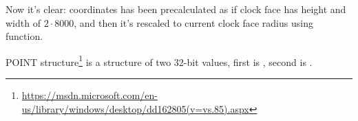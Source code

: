 Now it's clear: coordinates has been precalculated as if clock face has height and width of $2 \cdot 8000$,
and then it's rescaled to current clock face radius using  function.

POINT structure\footnote{\url{https://msdn.microsoft.com/en-us/library/windows/desktop/dd162805(v=vs.85).aspx}}
is a structure of two 32-bit values, first is , second is .

